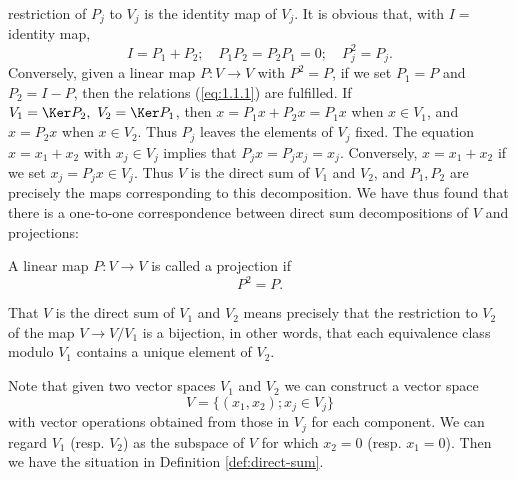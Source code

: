 restriction of $P_j$ to $V_j$ is the identity map of $V_j$. It is
obvious that, with $I=$ identity map,
\begin{equation}
  \label{eq:1.1.1}
  I=P_1+P_2;\quad P_1P_2=P_2P_1=0;\quad P_j^2=P_j.
\end{equation}
Conversely, given a linear map $P: V\to V$ with $P^2=P$, if we set
$P_1=P$ and $P_2=I-P$, then the relations (\ref{eq:1.1.1}) are
fulfilled. If $V_1=\Ker P_2,\ V_2=\Ker P_1$, then $x=P_1x+P_2x=P_1x$
when $x\in V_1$, and $x=P_2x$ when $x\in V_2$. Thus $P_j$ leaves the
elements of $V_j$ fixed. The equation $x=x_1+x_2$ with $x_j\in V_j$
implies that $P_jx=P_jx_j=x_j$. Conversely, $x=x_1+x_2$ if we set
$x_j=P_jx\in V_j$. Thus $V$ is the direct sum of $V_1$ and $V_2$, and
$P_1,P_2$ are precisely the maps corresponding to this
decomposition. We have thus found that there is a one-to-one
correspondence between direct sum decompositions of $V$ and
projections:
\begin{dfn}
  A linear map $P: V\to V$ is called a projection if
  \begin{displaymath}
    P^2=P.
  \end{displaymath}
\end{dfn}
That $V$ is the direct sum of $V_1$ and $V_2$ means precisely that the
restriction to $V_2$ of the map $V\to V/V_1$ is a bijection, in other
words, that each equivalence class modulo $V_1$ contains a unique
element of $V_2$.\par
Note that given two vector spaces $V_1$ and $V_2$ we can construct a
vector space
\begin{displaymath}
  V=\{(x_1,x_2);x_j\in V_j\}
\end{displaymath}
with vector operations obtained from those in $V_j$ for each
component. We can regard $V_1$ (resp. $V_2$) as the subspace of $V$
for which $x_2=0$ (resp. $x_1=0$). Then we have the situation in
Definition \ref{def:direct-sum}.

